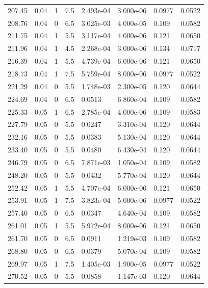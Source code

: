 \documentclass[preview]{standalone}
\begin{document}
{{{\begin{tabular}{L{1.2cm}C{1.2cm} C{0.3cm}C{0.5cm} C{1.4cm}C{1.4cm} C{1.4cm}C{1.4cm}}
  207.45  &  0.04  & 1     & 7.5 &  2.493e-04  & 3.000e-06  & 0.0977 &  0.0522   \\ 
  208.76  &  0.04  & 0     & 6.5 &  3.025e-03  & 4.000e-05  & 0.109 &  0.0582   \\ 
  211.75  &  0.04  & 1     & 5.5 &  3.117e-04  & 4.000e-06  & 0.121 &  0.0650   \\ 
  211.96  &  0.04  & 1     & 4.5 &  2.268e-04  & 3.000e-06  & 0.134 &  0.0717   \\ 
  216.39  &  0.04  & 1     & 5.5 &  4.739e-04  & 6.000e-06  & 0.121 &  0.0650   \\ 
  218.73  &  0.04  & 1     & 7.5 &  5.759e-04  & 8.000e-06  & 0.0977 &  0.0522   \\ 
  221.29  &  0.04  & 0     & 5.5 &  1.748e-03  & 2.300e-05  & 0.120 &  0.0644   \\ 
  224.69  &  0.04  & 0     & 6.5 &  0.0513  & 6.860e-04  & 0.109 &  0.0582   \\ 
  225.33  &  0.05  & 1     & 6.5 &  2.785e-04  & 4.000e-06  & 0.109 &  0.0583   \\ 
  227.79  &  0.05  & 0     & 5.5 &  0.0247  & 3.310e-04  & 0.120 &  0.0644   \\ 
  232.16  &  0.05  & 0     & 5.5 &  0.0383  & 5.130e-04  & 0.120 &  0.0644   \\ 
  233.40  &  0.05  & 0     & 5.5 &  0.0480  & 6.430e-04  & 0.120 &  0.0644   \\ 
  246.79  &  0.05  & 0     & 6.5 &  7.871e-03  & 1.050e-04  & 0.109 &  0.0582   \\ 
  248.20  &  0.05  & 0     & 5.5 &  0.0432  & 5.770e-04  & 0.120 &  0.0644   \\ 
  252.42  &  0.05  & 1     & 5.5 &  4.707e-04  & 6.000e-06  & 0.121 &  0.0650   \\ 
  253.91  &  0.05  & 1     & 7.5 &  3.823e-04  & 5.000e-06  & 0.0977 &  0.0522   \\ 
  257.40  &  0.05  & 0     & 6.5 &  0.0347  & 4.640e-04  & 0.109 &  0.0582   \\ 
  261.01  &  0.05  & 1     & 5.5 &  5.972e-04  & 8.000e-06  & 0.121 &  0.0650   \\ 
  261.70  &  0.05  & 0     & 6.5 &  0.0911  & 1.219e-03  & 0.109 &  0.0582   \\ 
  268.80  &  0.05  & 0     & 6.5 &  0.0379  & 5.070e-04  & 0.109 &  0.0582   \\ 
  269.97  &  0.05  & 1     & 7.5 &  1.405e-03  & 1.900e-05  & 0.0977 &  0.0522   \\ 
  270.52  &  0.05  & 0     & 5.5 &  0.0858  & 1.147e-03  & 0.120 &  0.0644   \\ 

\end{tabular}}}}
\end{document}
